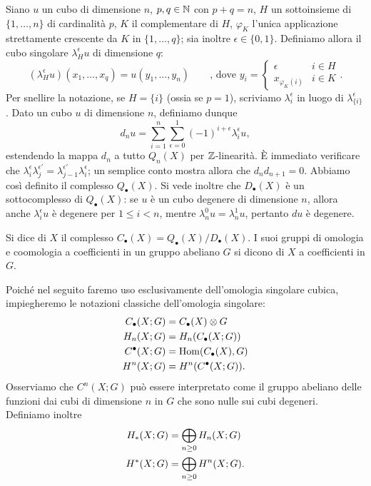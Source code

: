 Siano \(u\) un cubo di dimensione \(n\), \(p,q\in\mathbb{N}\) con \(p+q=n\), \(H\) un sottoinsieme di \(\{1,\ldots,n\}\) di cardinalità \(p\), \(K\) il complementare di \(H\), \(\varphi_K\) l'unica applicazione strettamente crescente da \(K\) in \(\{1,\ldots,q\}\); sia inoltre \(\epsilon\in\{0,1\}\). Definiamo allora il cubo singolare \(\lambda^\epsilon_Hu\) di dimensione \(q\):
\[
(\lambda^\epsilon_Hu)(x_1,\ldots,x_q)=u(y_1,\ldots,y_n)\qquad\text{, dove }y_i=\begin{cases}\epsilon&i\in H\\x_{\varphi_K(i)}&i\in K\end{cases}.
\]
Per snellire la notazione, se \(H=\{i\}\) (ossia se \(p=1\)), scriviamo \(\lambda^\epsilon_i\) in luogo di \(\lambda^\epsilon_{\{i\}}\). Dato un cubo \(u\) di dimensione \(n\), definiamo dunque
\[
d_nu=\sum_{i=1}^n\sum_{\epsilon=0}^1(-1)^{i+\epsilon}\lambda^\epsilon_iu,
\]
estendendo la mappa \(d_n\) a tutto \(Q_n(X)\) per \(\mathbb{Z}\)-linearità. È immediato verificare che \(\lambda^\epsilon_i\lambda^{\epsilon'}_j=\lambda^{\epsilon'}_{j-1}\lambda^\epsilon_i\); un semplice conto mostra allora che \(d_nd_{n+1}=0\). Abbiamo così definito il complesso \(Q_\bullet(X)\). Si vede inoltre che \(D_\bullet(X)\) è un sottocomplesso di \(Q_\bullet(X)\): se \(u\) è un cubo degenere di dimensione \(n\), allora anche \(\lambda^\epsilon_iu\) è degenere per \(1\le i<n\), mentre \(\lambda^0_nu=\lambda^1_nu\), pertanto \(du\) è degenere.
\begin{definition}
Si dice  di \(X\) il complesso \(C_\bullet(X)=Q_\bullet(X)/D_\bullet(X)\). I suoi gruppi di omologia e coomologia a coefficienti in un gruppo abeliano \(G\) si dicono  di \(X\) a coefficienti in \(G\).
\end{definition}
Poiché nel seguito faremo uso esclusivamente dell'omologia singolare cubica, impiegheremo le notazioni classiche dell'omologia singolare: 
\begin{align*}
C_\bullet(X;G)&=C_\bullet(X)\mathbin{\otimes} G\\
H_n(X;G)&=H_n(C_\bullet(X;G))\\
C^\bullet(X;G)&=\operatorname{Hom}(C_\bullet(X),G)\\
H^n(X;G)&=H^n(C^\bullet(X;G)).
\end{align*}
Osserviamo che \(C^n(X;G)\) può essere interpretato come il gruppo abeliano delle funzioni dai cubi di dimensione \(n\) in \(G\) che sono nulle sui cubi degeneri. Definiamo inoltre
\begin{align*}
H_*(X;G)&=\bigoplus_{n\ge 0}H_n(X;G)\\
H^*(X;G)&=\bigoplus_{n\ge 0}H^n(X;G).
\end{align*}

